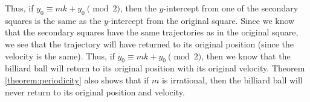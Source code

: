Thus, if $y_0 \equiv mk + y_0 \pmod{2}$, then the $y$-intercept from one of the secondary squares is the same as the $y$-intercept from the original square. Since we know that the secondary squares have the same trajectories as in the original square, we see that the trajectory will have returned to its original position (since the velocity is the same). Thus, if $y_0 \equiv mk + y_0 \pmod{2}$, then we know that the billiard ball will return to its original position with its original velocity. Theorem \ref{theorem:periodicity} also shows that if $m$ is irrational, then the billiard ball will never return to its original position and velocity.
